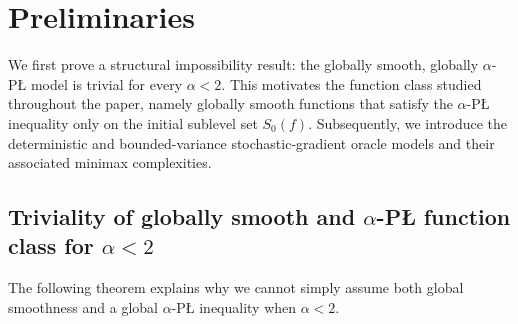 \documentclass[11pt]{article}
\newcommand{\R}{\mathbb{R}}
\newcommand{\norm}[1]{\left\lVert #1\right\rVert}
\begin{document}
\section{Preliminaries}
\label{sec:preliminaries}

We first prove a structural impossibility result: the
globally smooth, globally $\alpha$-P\L{} model is trivial for every $\alpha<2$. This motivates the function class
studied throughout the paper, namely globally smooth functions that satisfy the
$\alpha$-P\L{} inequality only on the initial sublevel set $S_0(f)$. Subsequently, we introduce the deterministic and
bounded-variance stochastic-gradient oracle models and their associated minimax complexities. %

\subsection{\texorpdfstring{Triviality of globally smooth and $\alpha$-P\L{} function class for $\alpha<2$}{Global smoothness plus global alpha-PL is trivial for alpha<2}}

The following theorem explains why we cannot simply assume both global smoothness and a global \(\alpha\)-P\L{}
inequality when \(\alpha<2\). 
\end{document}

